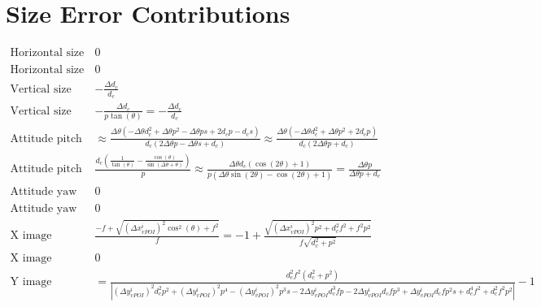 \section{Size Error Contributions}
\begin{align*}
\text{Horizontal size error (longitudinal): }&0 \\
\text{Horizontal size error (lateral): }&0 \\
\text{Vertical size error (longitudinal): }&- \frac{\Delta{d_c}}{d_{c}} \\
\text{Vertical size error (lateral): }&- \frac{\Delta{d_c}}{p \tan{\left(\theta \right)}} = - \frac{\Delta{d_c}}{d_{c}} \\
\text{Attitude pitch size error (longitudinal): }&\approx \frac{\Delta{\theta} \left(- \Delta{\theta} d_{c}^{2} + \Delta{\theta} p^{2} - \Delta{\theta} p s + 2 d_{c} p - d_{c} s\right)}{d_{c} \left(2 \Delta{\theta} p - \Delta{\theta} s + d_{c}\right)} \approx \frac{\Delta{\theta} \left(- \Delta{\theta} d_{c}^{2} + \Delta{\theta} p^{2} + 2 d_{c} p\right)}{d_{c} \left(2 \Delta{\theta} p + d_{c}\right)} \\
\text{Attitude pitch size error (lateral): }&\frac{d_{c} \left(\frac{1}{\tan{\left(\theta \right)}} - \frac{\cos{\left(\theta \right)}}{\sin{\left(\Delta{\theta} + \theta \right)}}\right)}{p} \approx \frac{\Delta{\theta} d_{c} \left(\cos{\left(2 \theta \right)} + 1\right)}{p \left(\Delta{\theta} \sin{\left(2 \theta \right)} - \cos{\left(2 \theta \right)} + 1\right)} = \frac{\Delta{\theta} p}{\Delta{\theta} p + d_{c}} \\
\text{Attitude yaw size error (longitudinal): }&0 \\
\text{Attitude yaw size error (lateral): }&0 \\
\text{X image coordinate size error (longitudinal): }&\frac{- f + \sqrt{\left(\Delta{x^i_{vPOI}}\right)^{2} \cos^{2}{\left(\theta \right)} + f^{2}}}{f} = -1 + \frac{\sqrt{\left(\Delta{x^i_{vPOI}}\right)^{2} p^{2} + d_{c}^{2} f^{2} + f^{2} p^{2}}}{f \sqrt{d_{c}^{2} + p^{2}}} \\
\text{X image coordinate size error (lateral): }&0 \\
\text{Y image coordinate size error (longitudinal): }&= \frac{d_{c}^{2} f^{2} \left(d_{c}^{2} + p^{2}\right)}{\left|{\left(\Delta{y^i_{vPOI}}\right)^{2} d_{c}^{2} p^{2} + \left(\Delta{y^i_{vPOI}}\right)^{2} p^{4} - \left(\Delta{y^i_{vPOI}}\right)^{2} p^{3} s - 2 \Delta{y^i_{vPOI}} d_{c}^{3} f p - 2 \Delta{y^i_{vPOI}} d_{c} f p^{3} + \Delta{y^i_{vPOI}} d_{c} f p^{2} s + d_{c}^{4} f^{2} + d_{c}^{2} f^{2} p^{2}}\right|} - 1 \\

\end{align*}
